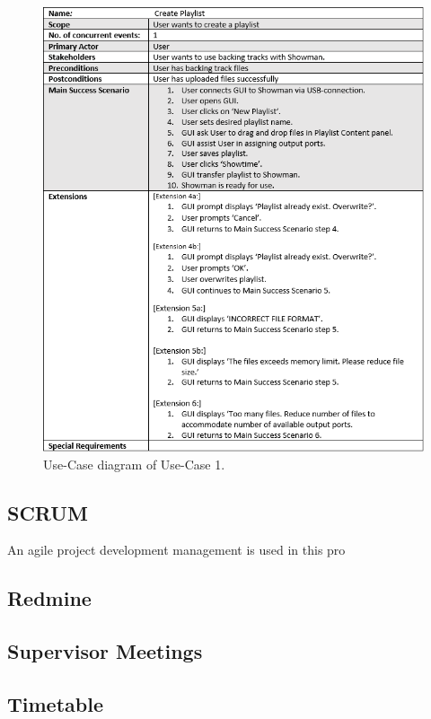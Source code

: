 \begin{figure}[H]
\centering
\includegraphics[scale=1]{./pictures/UC1.png}
\caption{Use-Case diagram of Use-Case 1.}
\label{fig:UC1.png}
\end{figure}

\subsection{SCRUM}
An agile project development management is used in this pro


\subsection{Redmine}


\subsection{Supervisor Meetings}


\subsection{Timetable}


